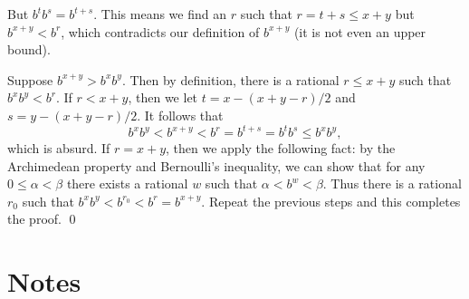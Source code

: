 \begin{enumerate}
\begin{enumerate}
    But \(b^t b^s = b^{t+s}\).  This means we find an \(r\) such that \(r = t + s \le x + y\) but \(b^{x+y} < b^r\), which contradicts our definition of \(b^{x+y}\) (it is not even an upper bound).

    Suppose \(b^{x+y} > b^x b^y\).  Then by definition, there is a rational \(r \le x + y\) such that \(b^x b^y < b^r\).  If \(r < x + y\), then we let \(t = x - (x+y-r)/2\) and \(s = y - (x+y-r)/2\).  It follows that
    \begin{equation*}
      b^x b^y < b^{x+y} < b^r = b^{t+s} = b^t b^s \le b^x b^y,
    \end{equation*}
    which is absurd.  If \(r = x + y\), then we apply the following fact: by the Archimedean property and Bernoulli's inequality, we can show that for any \(0 \le α < β\) there exists a rational \(w\) such that \(α < b^w < β\).  Thus there is a rational \(r_0\) such that \(b^x b^y < b^{r_0} < b^r = b^{x+y}\).  Repeat the previous steps and this completes the proof.
    \qed
  \end{enumerate}
\end{enumerate}

\section{Notes}




